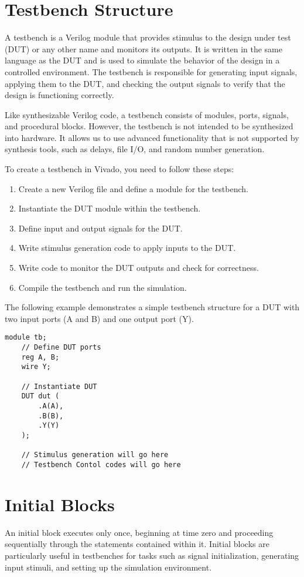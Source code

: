 \documentclass{report}
\begin{document}
\section{Testbench Structure}

A testbench is a Verilog module that provides stimulus to the design under test (DUT) or any other name and monitors its outputs. It is written in the same language as the DUT and is used to simulate the behavior of the design in a controlled environment. The testbench is responsible for generating input signals, applying them to the DUT, and checking the output signals to verify that the design is functioning correctly.

Like synthesizable Verilog code, a testbench consists of modules, ports, signals, and procedural blocks. However, the testbench is not intended to be synthesized into hardware. It allows us to use advanced functionality that is not supported by synthesis tools, such as delays, file I/O, and random number generation.

To create a testbench in Vivado, you need to follow these steps:
\begin{enumerate}
    \item Create a new Verilog file and define a module for the testbench.
    \item Instantiate the DUT module within the testbench.
    \item Define input and output signals for the DUT.
    \item Write stimulus generation code to apply inputs to the DUT.
    \item Write code to monitor the DUT outputs and check for correctness.
    \item Compile the testbench and run the simulation.
\end{enumerate}

The following example demonstrates a simple testbench structure for a DUT with two input ports (A and B) and one output port (Y).
\begin{verbatim}
module tb;
    // Define DUT ports
    reg A, B;
    wire Y;

    // Instantiate DUT
    DUT dut (
        .A(A),
        .B(B),
        .Y(Y)
    );

    // Stimulus generation will go here
    // Testbench Contol codes will go here
\end{verbatim}

\section{Initial Blocks}
An initial block executes only once, beginning at time zero and proceeding sequentially through the statements contained within it. Initial blocks are particularly useful in testbenches for tasks such as signal initialization, generating input stimuli, and setting up the simulation environment. 
\end{document}

